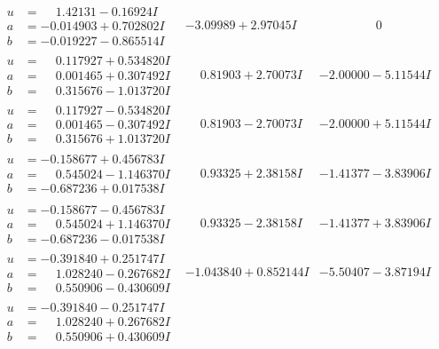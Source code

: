 \documentclass[1p]{elsarticle_modified}
\theoremstyle{definition}
\begin{document}
$$\begin{array}{c|c|c}
\begin{aligned}
u &= \phantom{-}1.42131 - 0.16924 I \\
a &= -0.014903 + 0.702802 I \\
b &= -0.019227 - 0.865514 I\end{aligned}
 & -3.09989 + 2.97045 I & \phantom{-0.000000 } 0 \\ \hline\begin{aligned}
u &= \phantom{-}0.117927 + 0.534820 I \\
a &= \phantom{-}0.001465 + 0.307492 I \\
b &= \phantom{-}0.315676 - 1.013720 I\end{aligned}
 & \phantom{-}0.81903 + 2.70073 I & -2.00000 - 5.11544 I \\ \hline\begin{aligned}
u &= \phantom{-}0.117927 - 0.534820 I \\
a &= \phantom{-}0.001465 - 0.307492 I \\
b &= \phantom{-}0.315676 + 1.013720 I\end{aligned}
 & \phantom{-}0.81903 - 2.70073 I & -2.00000 + 5.11544 I \\ \hline\begin{aligned}
u &= -0.158677 + 0.456783 I \\
a &= \phantom{-}0.545024 - 1.146370 I \\
b &= -0.687236 + 0.017538 I\end{aligned}
 & \phantom{-}0.93325 + 2.38158 I & -1.41377 - 3.83906 I \\ \hline\begin{aligned}
u &= -0.158677 - 0.456783 I \\
a &= \phantom{-}0.545024 + 1.146370 I \\
b &= -0.687236 - 0.017538 I\end{aligned}
 & \phantom{-}0.93325 - 2.38158 I & -1.41377 + 3.83906 I \\ \hline\begin{aligned}
u &= -0.391840 + 0.251747 I \\
a &= \phantom{-}1.028240 - 0.267682 I \\
b &= \phantom{-}0.550906 - 0.430609 I\end{aligned}
 & -1.043840 + 0.852144 I & -5.50407 - 3.87194 I \\ \hline\begin{aligned}
u &= -0.391840 - 0.251747 I \\
a &= \phantom{-}1.028240 + 0.267682 I \\
b &= \phantom{-}0.550906 + 0.430609 I\end{aligned}

\end{array}$$
\end{document}
